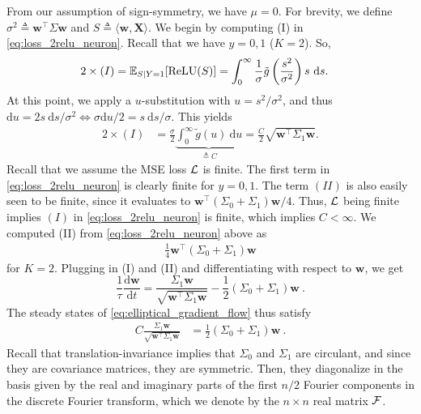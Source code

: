 From our assumption of sign-symmetry, we have $\mu = 0$.
For brevity, we define $\sigma^2 \triangleq \mathbf{w}^\top \Sigma \mathbf{w}$ and $S \triangleq \langle \mathbf{w}, \mathbf{X} \rangle$.
We begin by computing (I) in \cref{eq:loss_2relu_neuron}.
Recall that we have $y = 0,1$ (\ie $K = 2$).
So,
\begin{align*}
    2 \times (I) 
    &= \operatorname{\mathbb{E}}_{S \mid Y=1}[ \operatorname{ReLU}( S ) ]
    = \int_0^{\infty} \frac{1}{\sigma} \tilde{g}\left( \frac{s^2}{\sigma^2} \right) s \ \mathrm{d}s.
\end{align*}
At this point, we apply a $u$-substitution with $u = s^2 / \sigma^2$, and thus $\mathrm{d}u = 2 s \ \mathrm{d}s / \sigma^2 \iff \sigma \mathrm{d}u / 2 = s\ \mathrm{d}s / \sigma$.
This yields
\begin{align*}
    2 \times (I) 
    &= \frac{\sigma}{2} \underbrace{\int_0^{\infty} \tilde{g}(u)\ \mathrm{d}u}_{\triangleq C}
    = \frac{C}{2} \sqrt{\mathbf{w}^\top \Sigma_1 \mathbf{w}}.
\end{align*}
Recall that we assume the MSE loss $\operatorname{\mathcal{L}}$ is finite.
The first term in \cref{eq:loss_2relu_neuron} is clearly finite for $y = 0,1$.
The term $(II)$ is also easily seen to be finite, since it evaluates to $\mathbf{w}^\top (\Sigma_0 + \Sigma_1) \mathbf{w} / 4$.
Thus, $\operatorname{\mathcal{L}}$ being finite implies $(I)$ in \cref{eq:loss_2relu_neuron} is finite,  which implies $C < \infty$.
We computed (II) from \cref{eq:loss_2relu_neuron} above as
\begin{align*}
  \frac{1}{4} \mathbf{w}^\top \left( \Sigma_0 + \Sigma_1 \right) \mathbf{w}
\end{align*}
for $K = 2$.
Plugging in (I) and (II) and differentiating with respect to $\mathbf{w}$, we get
\begin{equation}
  \frac{1}{\tau} \frac{\mathrm{d}\mathbf{w}}{\mathrm{d}t} = \frac{\Sigma_1 \mathbf{w}}{\sqrt{\mathbf{w}^\top \Sigma_1 \mathbf{w}}} - \frac{1}{2} \left( \Sigma_0 + \Sigma_1 \right) \mathbf{w}~. \label{eq:elliptical_gradient_flow}
\end{equation}
The steady states of \cref{eq:elliptical_gradient_flow} thus satisfy
\begin{align*}
  C \frac{\Sigma_1 \mathbf{w}}{\sqrt{\mathbf{w}^\top \Sigma_1 \mathbf{w}}} 
  &= \frac{1}{2} \left( \Sigma_0 + \Sigma_1 \right) \mathbf{w}~.
\end{align*}
Recall that translation-invariance implies that $\Sigma_0$ and $\Sigma_1$ are circulant, and since they are covariance matrices, they are symmetric.
Then, they diagonalize in the basis given by the real and imaginary parts of the first $n/2$ Fourier components in the discrete Fourier transform, which we denote by the $n \times n$ real matrix $\operatorname{\mathcal{F}}$.
